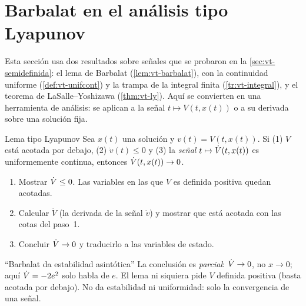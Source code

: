 \section{Barbalat en el análisis tipo Lyapunov}
\label{sec:av-barbalat}

Esta sección usa dos resultados sobre señales que se probaron en la \cref{sec:vt-semidefinida}: el lema de Barbalat (\cref{lem:vt-barbalat}), con la continuidad uniforme (\cref{def:vt-unifcont}) y la trampa de la integral finita (\cref{tr:vt-integral}), y el teorema de LaSalle--Yoshizawa (\cref{thm:vt-ly}). Aquí se convierten en una herramienta de análisis: se aplican a la señal $t\mapsto V(t,x(t))$ o a su derivada sobre una solución fija.

\begin{lema}[label=lem:av-tipolyap]{Lema tipo Lyapunov \citep[Lema~4.3]{SlLi91}}
Sea $x(t)$ una solución y $v(t)=V(t,x(t))$. Si (1) $V$ está acotada por debajo, (2) $\dot v(t)\le0$ y (3) la \emph{señal} $t\mapsto\dot V(t,x(t))$ es uniformemente continua, entonces $\dot V(t,x(t))\to0$.
\end{lema}

\begin{receta}
\begin{enumerate}
  \item Mostrar $\dot V\le0$. Las variables en las que $V$ es definida positiva quedan acotadas.
  \item Calcular $\ddot V$ (la derivada de la señal $\dot v$) y mostrar que está acotada con las cotas del paso~1.
  \item Concluir $\dot V\to0$ y traducirlo a las variables de estado.
\end{enumerate}
\end{receta}

\begin{trampa}[label=tr:av-barbalat]{``Barbalat da estabilidad asintótica''}
La conclusión es \emph{parcial}: $\dot V\to0$, no $x\to0$; aquí $\dot V=-2e^2$ solo habla de $e$. El lema ni siquiera pide $V$ definida positiva (basta acotada por debajo). No da estabilidad ni uniformidad: solo la convergencia de una señal.
\end{trampa}

